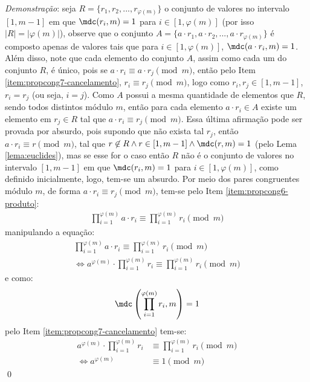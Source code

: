 \noindent
\textit{Demonstração}: seja $R = \{r_1, r_2, ..., r_{\varphi(m)}\}$ o conjunto de valores no intervalo $[1, m-1]$ em que $\mdc(r_i, m) = 1$ para $i \in [1, \varphi(m)]$ (por isso $|R| = |\varphi(m)|$), observe que o conjunto $A = \{a \cdot r_1, a \cdot r_2, ..., a \cdot r_{\varphi(m)}\}$ é composto apenas de valores tais que para $i \in [1, \varphi(m)]$, $\mdc(a \cdot r_i, m) = 1$. Além disso, note que cada elemento do conjunto $A$, assim como cada um do conjunto $R$, é único, pois se $a \cdot r_i \equiv a \cdot r_j \pmod{m}$, então pelo Item \ref{item:propcong7-cancelamento}, $r_i \equiv r_j \pmod{m}$, logo como $r_i, r_j \in [1, m-1]$, $r_i = r_j$ (ou seja, $i = j$). Como $A$ possui a mesma quantidade de elementos que $R$, sendo todos distintos módulo $m$, então para cada elemento $a \cdot r_i \in A$ existe um elemento em $r_j \in R$ tal que $a \cdot r_i \equiv r_j \pmod{m}$. Essa última afirmação pode ser provada por absurdo, pois supondo que não exista tal $r_j$, então $a \cdot r_i \equiv r \pmod{m}$, tal que $r \not\in R \land r \in [1, m-1] \land \mdc(r, m) = 1$ (pelo Lema \ref{lema:euclides}), mas se esse for o caso então $R$ não é o conjunto de valores no intervalo $[1, m-1]$ em que $\mdc(r_i, m) = 1$ para $i \in [1, \varphi(m)]$, como definido inicialmente, logo, tem-se um absurdo.
Por meio dos pares congruentes módulo $m$, de forma $a \cdot r_i \equiv r_j \pmod{m}$, tem-se pelo Item \ref{item:propcong6-produto}:
\begin{align*}
    \prod_{i = 1}^{\varphi(m)} a \cdot r_i \equiv \prod_{i = 1}^{\varphi(m)} r_i \pmod{m}
\end{align*}
manipulando a equação:
\begin{align*}
    \prod_{i = 1}^{\varphi(m)} a \cdot r_i \equiv \prod_{i = 1}^{\varphi(m)} r_i \pmod{m}
    \\
    \Longleftrightarrow a^{\varphi(m)} \cdot \prod_{i = 1}^{\varphi(m)} r_i \equiv \prod_{i = 1}^{\varphi(m)} r_i \pmod{m}
\end{align*}
e como:
\begin{equation*}
    \mdc\left(\prod_{i = 1}^{\varphi(m)} r_i, m\right) = 1
\end{equation*}
pelo Item \ref{item:propcong7-cancelamento} tem-se:
\begin{align*}
    a^{\varphi(m)} \cdot \prod_{i = 1}^{\varphi(m)} r_i & \equiv \prod_{i = 1}^{\varphi(m)} r_i \pmod{m}
    \\
    \Longleftrightarrow a^{\varphi(m)} & \equiv 1 \pmod{m} 
\end{align*} \qed


